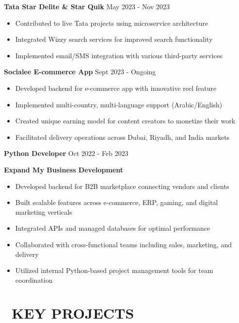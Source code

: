\documentclass[10pt,a4paper]{article}
\begin{document}
\begin{paracol}{2}
\begin{rightcolumn}
\textbf{Tata Star Delite \& Star Quik} \hfill \textcolor{mediumgray}{\footnotesize May 2023 - Nov 2023}
\begin{itemize}[leftmargin=10pt]
    \item Contributed to live Tata projects using microservice architecture
    \item Integrated Wizzy search services for improved search functionality
    \item Implemented email/SMS integration with various third-party services
\end{itemize}

\textbf{Socialee E-commerce App} \hfill \textcolor{mediumgray}{\footnotesize Sept 2023 - Ongoing}
\begin{itemize}[leftmargin=10pt]
    \item Developed backend for e-commerce app with innovative reel feature
    \item Implemented multi-country, multi-language support (Arabic/English)
    \item Created unique earning model for content creators to monetize their work
    \item Facilitated delivery operations across Dubai, Riyadh, and India markets
\end{itemize}

\vspace{2mm}
\textbf{\color{darkblue}Python Developer} \hfill \textcolor{mediumgray}{\small Oct 2022 - Feb 2023}

\textbf{Expand My Business Development}
\begin{itemize}[leftmargin=10pt]
    \item Developed backend for B2B marketplace connecting vendors and clients
    \item Built scalable features across e-commerce, ERP, gaming, and digital marketing verticals
    \item Integrated APIs and managed databases for optimal performance
    \item Collaborated with cross-functional teams including sales, marketing, and delivery
    \item Utilized internal Python-based project management tools for team coordination
\end{itemize}

\vspace{2mm}
\section*{\faCode\ KEY PROJECTS}


\end{rightcolumn}
\end{paracol}
\end{document}
